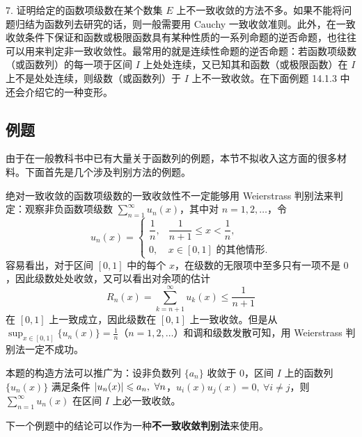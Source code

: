 7. 证明给定的函数项级数在某个数集 $E$ 上不一致收敛的方法不多。如果不能将问题归结为函数列去研究的话，则一般需要用 Cauchy 一致收敛准则。此外，在一致收敛条件下保证和函数或极限函数具有某种性质的一系列命题的逆否命题，也往往可以用来判定非一致收敛性。最常用的就是连续性命题的逆否命题：若函数项级数（或函数列）的每一项于区间 $I$ 上处处连续，又已知其和函数（或极限函数）在 $I$ 上不是处处连续，则级数（或函数列）于 $I$ 上不一致收敛。在下面例题 14.1.3 中还会介绍它的一种变形。

\subsection{例题}

由于在一般教科书中已有大量关于函数列的例题，本节不拟收入这方面的很多材料。下面首先是几个涉及判别方法的例题。

\begin{xexample}[14.1.2]
绝对一致收敛的函数项级数的一致收敛性不一定能够用 Weierstrass 判别法来判定：观察非负函数项级数 $\displaystyle\sum_{n=1}^{\infty}u_n(x)$，其中对 $n=1,2,\ldots$，令
\[
  u_n(x)=
  \begin{cases}
    \dfrac1n,& \dfrac1{n+1}\leqslant x<\dfrac1n,\\[4pt]
    0,& x\in[0,1]\text{ 的其他情形}.
  \end{cases}
\]
容易看出，对于区间 $[0,1]$ 中的每个 $x$，在级数的无限项中至多只有一项不是 $0$，因此级数处处收敛，又可以看出对余项的估计
\[
  R_n(x)=\sum_{k=n+1}^{\infty}u_k(x)\leqslant\frac1{n+1}
\]
在 $[0,1]$ 上一致成立，因此级数在 $[0,1]$ 上一致收敛。但是从 $\displaystyle\sup_{x\in[0,1]}\{u_n(x)\}=\frac1n$（$n=1,2,\ldots$）和调和级数发散可知，用 Weierstrass 判别法一定不成功。
\end{xexample}

\begin{xremark}
本题的构造方法可以推广为：设非负数列 $\{a_n\}$ 收敛于 $0$，区间 $I$ 上的函数列 $\{u_n(x)\}$ 满足条件 $\lvert u_n(x)\rvert\leqslant a_n,\ \forall n$，$u_i(x)u_j(x)=0,\ \forall i\ne j$，则 $\displaystyle\sum_{n=1}^{\infty}u_n(x)$ 在区间 $I$ 上必一致收敛。
\end{xremark}

下一个例题中的结论可以作为一种\textbf{不一致收敛判别法}来使用。

